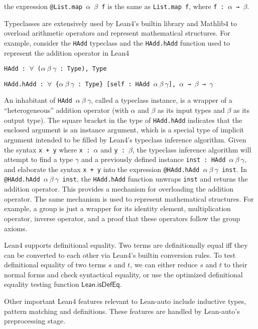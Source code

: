   \noindent the expression \texttt{@List.map $\alpha$ $\beta$ f} is the same as \texttt{List.map f}, where \texttt{f : $\alpha$ → $\beta$}.

  Typeclasses are extensively used by Lean4's builtin library and Mathlib4 to
  overload arithmetic operators and represent mathematical structures. For example,
  consider the \texttt{HAdd} typeclass and the \texttt{HAdd.hAdd} function
  used to represent the addition operator in Lean4
  
  \centerline{\texttt{HAdd : $\forall$ ($\alpha \ \beta \ \gamma$ : Type), Type}}
  \centerline{\texttt{HAdd.hAdd : $\forall$ \{$\alpha \ \beta \ \gamma$ : Type\} [self : HAdd $\alpha \ \beta \ \gamma$], $\alpha$ → $\beta$ → $\gamma$}}

  \noindent An inhabitant of \texttt{HAdd $\alpha \ \beta \ \gamma$}, called a
  typeclass instance, is a wrapper of a ``heterogeneous'' addition operator (with $\alpha$ and $\beta$ as its input types and
  $\beta$ as its output type). The square bracket in the type of \texttt{HAdd.hAdd}
  indicates that the enclosed argument is an instance argument, which is a special type
  of implicit argument intended to be filled by Lean4's typeclass inference algorithm.
  Given the syntax \texttt{x + y} where \texttt{x : $\alpha$} and \texttt{y : $\beta$},
  the typeclass inference algorithm will attempt to find a type $\gamma$ and a previously
  defined instance \texttt{inst : HAdd $\alpha \ \beta \ \gamma$}, and elaborate the
  syntax \texttt{x + y} into the expression \texttt{@HAdd.hAdd $\alpha \ \beta \ \gamma$ inst}.
  In \texttt{@HAdd.hAdd $\alpha \ \beta \ \gamma$ inst}, the \texttt{HAdd.hAdd} function
  unwraps \texttt{inst} and returns the addition operator. This provides a mechanism
  for overloading the addition operator. The same mechanism is used to represent mathematical
  structures. For example, a group is just a wrapper for its identity element, multiplication
  operator, inverse operator, and a proof that these operators follow the group axioms.

  Lean4 supports definitional equality. Two terms are definitionally equal
  iff they can be converted to each other via Lean4's builtin conversion rules.
  To test definitional equality of two terms $s$ and $t$, we can either reduce $s$ and
  $t$ to their normal forms and check syntactical equality, or use the optimized definitional
  equality testing function $\mathsf{Lean.isDefEq}$.

  Other important Lean4 features relevant to Lean-auto include inductive types, pattern matching and definitions.
  These features are handled by Lean-auto's preprocessing stage.
